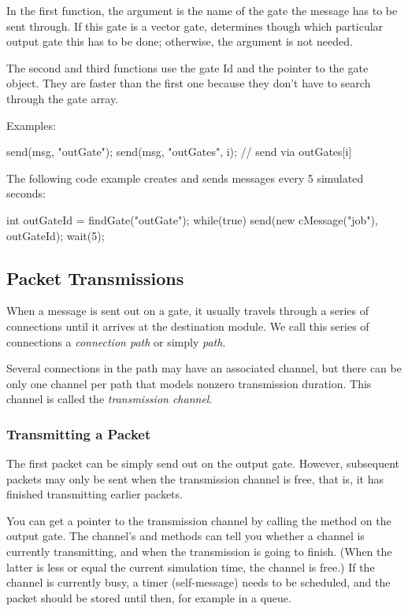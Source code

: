 In the first function, the argument  is the name of
the gate the message has to be sent through. If this gate is
a vector gate,  determines though which particular output
gate this has to be done; otherwise, the  argument is not
needed.

The second and third functions use the gate Id and the pointer to the gate
object. They are faster than the first one because they don't have to
search through the gate array.

Examples:

\begin{cpp}
send(msg, "outGate");
send(msg, "outGates", i); // send via outGates[i]
\end{cpp}

The following code example creates and sends messages
every 5 simulated seconds:

\begin{cpp}
int outGateId = findGate("outGate");
while(true)
{
  send(new cMessage("job"), outGateId);
  wait(5);
}
\end{cpp}


\subsection{Packet Transmissions}
\label{sec:simple-modules:packet-transmission}

When a message is sent out on a gate, it usually travels through
a series of connections until it arrives at the destination module.
We call this series of connections a \textit{connection path} or
simply \textit{path}.

Several connections in the path may have an associated channel,
but there can be only one channel per path that models nonzero
transmission duration. This channel is called the
\textit{transmission channel}.

\subsubsection{Transmitting a Packet}

The first packet can be simply send out on the output gate. However,
subsequent packets may only be sent when the transmission channel
is free, that is, it has finished transmitting earlier packets.

You can get a pointer to the transmission channel by calling the
 method on the output gate.
The channel's  and 
methods can tell you whether a channel is currently transmitting,
and when the transmission is going to finish. (When the latter is
less or equal the current simulation time, the channel is free.)
If the channel is currently busy, a timer (self-message) needs to
be scheduled, and the packet should be stored until then, for example
in a queue.

